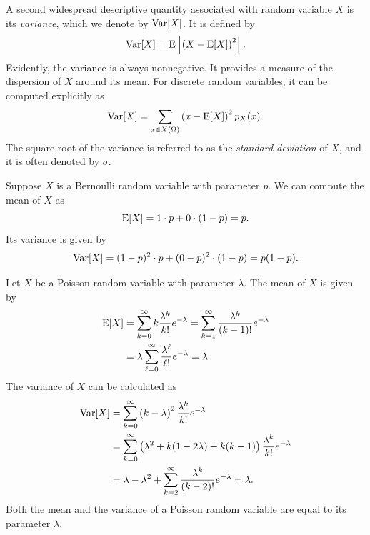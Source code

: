 A second widespread descriptive quantity associated with random variable $X$ is its \emph{variance}, which we denote by $\mathrm{Var} [X]$. 
It is defined by
\begin{equation} \label{equation:VarianceExplicit}
\mathrm{Var} [X] = \mathrm{E} \left[ \left( X - \mathrm{E} [X] \right)^2 \right] .
\end{equation}
Evidently, the variance is always nonnegative.
It provides a measure of the dispersion of $X$ around its mean.
For discrete random variables, it can be computed explicitly as
\begin{equation*}
\mathrm{Var} [X] = \sum_{x \in X(\Omega)} \left( x - \mathrm{E} [X] \right)^2 p_X (x) .
\end{equation*}
The square root of the variance is referred to as the \emph{standard deviation} of $X$, and it is often denoted by $\sigma$. 

\begin{example}
Suppose $X$ is a Bernoulli random variable with parameter $p$.
We can compute the mean of $X$ as
\begin{equation*}
\mathrm{E} [X] = 1 \cdot p + 0 \cdot (1 - p) = p .
\end{equation*}
Its variance is given by
\begin{equation*}
\mathrm{Var} [X] = (1 - p)^2 \cdot p + (0 - p)^2 \cdot (1 - p)
= p (1 - p) .
\end{equation*}
\end{example}

\begin{example} \label{example:PoissonMeanVariance}
Let $X$ be a Poisson random variable with parameter $\lambda$.
The mean of $X$ is given by
\begin{equation*}
\begin{split}
\mathrm{E} [X] &= \sum_{k=0}^{\infty} k \frac{\lambda^k}{k!} e^{- \lambda}
= \sum_{k=1}^{\infty} \frac{\lambda^k}{(k-1)!} e^{- \lambda} \\
&= \lambda \sum_{\ell=0}^{\infty} \frac{\lambda^\ell}{\ell!} e^{- \lambda}
= \lambda .
\end{split}
\end{equation*}
The variance of $X$ can be calculated as
\begin{equation*}
\begin{split}
\mathrm{Var} [X] &= \sum_{k=0}^{\infty} \left( k - \lambda \right)^2
\frac{\lambda^k}{k!} e^{- \lambda} \\
&= \sum_{k=0}^{\infty} \left(\lambda^2 + k (1 - 2 \lambda) + k(k-1) \right)
\frac{\lambda^k}{k!} e^{- \lambda} \\
&= \lambda - \lambda^2
+ \sum_{k=2}^{\infty} \frac{\lambda^k}{(k-2)!} e^{- \lambda}
= \lambda .
\end{split}
\end{equation*}
Both the mean and the variance of a Poisson random variable are equal to its parameter $\lambda$.
\end{example}


